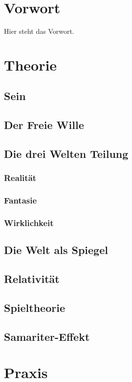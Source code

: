 
\part{Vorwort}
Hier steht das Vorwort.
\part{Theorie}

    \chapter{Sein}

    \chapter{Der Freie Wille}

    \chapter{Die drei Welten Teilung}
        \section{Realität}
        \section{Fantasie}
        \section{Wirklichkeit}

    \chapter{Die Welt als Spiegel}

    \chapter{Relativität}

    \chapter{Spieltheorie}

    \chapter{Samariter-Effekt}
\part{Praxis}

